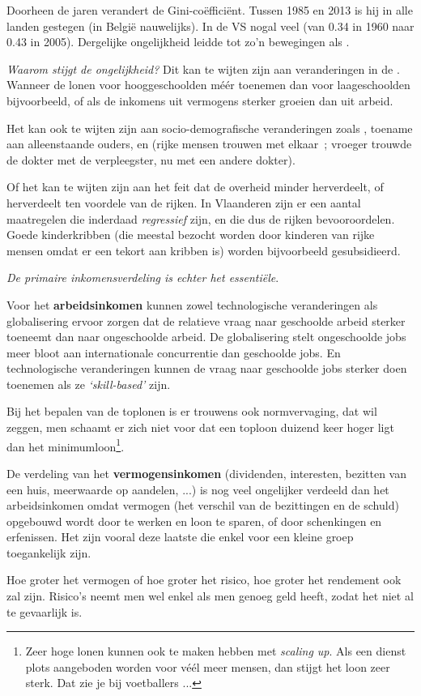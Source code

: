 \par Doorheen de jaren verandert de Gini-co\"effici\"ent. Tussen 1985 en 2013 is hij in alle landen gestegen (in Belgi\"e nauwelijks). In de VS nogal veel (van 0.34 in 1960 naar 0.43 in 2005). Dergelijke ongelijkheid leidde tot zo'n bewegingen als .\\

\par \textit{Waarom stijgt de ongelijkheid?} Dit kan te wijten zijn aan veranderingen in de . Wanneer de lonen voor hooggeschoolden m\'e\'er toenemen dan voor laageschoolden bijvoorbeeld, of als de inkomens uit vermogens sterker groeien dan uit arbeid.
\par Het kan ook te wijten zijn aan socio-demografische veranderingen zoals , toename aan alleenstaande ouders, en  (rijke mensen trouwen met \mbox{elkaar ;} vroeger trouwde de dokter met de verpleegster, nu met een andere dokter).
\par Of het kan te wijten zijn aan het feit dat de overheid minder herverdeelt, of herverdeelt  ten voordele van de rijken. In Vlaanderen zijn er een aantal maatregelen die inderdaad \textit{regressief} zijn, en die dus de rijken bevooroordelen. Goede kinderkribben (die meestal bezocht worden door kinderen van rijke mensen omdat er een tekort aan kribben is) worden bijvoorbeeld gesubsidieerd.\\
 
\par \textit{De primaire inkomensverdeling is echter het essenti\"ele}.
\par Voor het \textbf{arbeidsinkomen} kunnen zowel technologische veranderingen als globalisering ervoor zorgen dat de relatieve vraag naar geschoolde arbeid sterker toeneemt dan naar ongeschoolde arbeid. De globalisering stelt ongeschoolde jobs meer bloot aan internationale concurrentie dan geschoolde jobs. En technologische veranderingen kunnen de vraag naar geschoolde jobs sterker doen toenemen als ze \textit{`skill-based'} zijn.
\par Bij het bepalen van de toplonen is er trouwens ook normvervaging, dat wil zeggen, men schaamt er zich niet voor dat een toploon duizend keer hoger ligt dan het minimumloon\footnote{Zeer hoge lonen kunnen ook te maken hebben met \textit{scaling up}. Als een dienst plots aangeboden worden voor v\'e\'el meer mensen, dan stijgt het loon zeer sterk. Dat zie je bij voetballers ...}.
\par De verdeling van het \textbf{vermogensinkomen} (dividenden, interesten, bezitten van een huis, meerwaarde op aandelen, ...) is nog veel ongelijker verdeeld dan het arbeidsinkomen omdat vermogen (het verschil van de bezittingen en de schuld) opgebouwd wordt door te werken en loon te sparen, of door schenkingen en erfenissen. Het zijn vooral deze laatste die enkel voor een kleine groep toegankelijk zijn. 
\par Hoe groter het vermogen of hoe groter het risico, hoe groter het rendement ook zal zijn. Risico's neemt men wel enkel als men genoeg geld heeft, zodat het niet al te gevaarlijk is.\\

